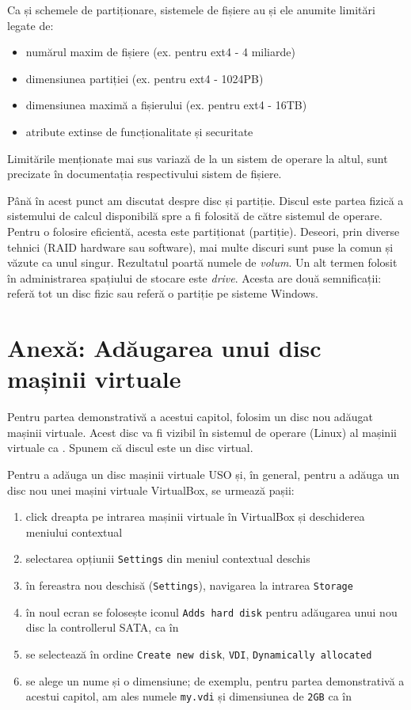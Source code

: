 Ca și schemele de partiționare, sistemele de fișiere au și ele anumite limitări legate de:

\begin{itemize}
  \item numărul maxim de fișiere (ex. pentru ext4 - 4 miliarde)
  \item dimensiunea partiției (ex. pentru ext4 - 1024PB)
  \item dimensiunea maximă a fișierului (ex. pentru ext4 - 16TB)
  \item atribute extinse de funcționalitate și securitate
\end{itemize}

Limitările menționate mai sus variază de la un sistem de operare la altul, sunt precizate în documentația respectivului sistem de fișiere.

Până în acest punct am discutat despre disc și partiție.
Discul este partea fizică a sistemului de calcul disponibilă spre a fi folosită de către sistemul de operare.
Pentru o folosire eficientă, acesta este partiționat (partiție).
 Deseori, prin diverse tehnici (RAID hardware sau software), mai multe discuri sunt puse la comun și văzute ca unul singur.
 Rezultatul poartă numele de \textit{volum}.
Un alt termen folosit în administrarea spațiului de stocare este \textit{drive}.
Acesta are două semnificații: referă tot un disc fizic sau referă o partiție pe sisteme Windows.

\section{Anexă: Adăugarea unui disc mașinii virtuale}
\label{sec:storage:vm-disk}

Pentru partea demonstrativă a acestui capitol, folosim un disc nou adăugat mașinii virtuale.
 Acest disc va fi vizibil în sistemul de operare (Linux) al mașinii virtuale ca .
Spunem că discul este un disc virtual.

Pentru a adăuga un disc mașinii virtuale USO și, în general, pentru a adăuga un disc nou unei mașini virtuale VirtualBox, se urmează pașii:
\begin{enumerate}
  \item click dreapta pe intrarea mașinii virtuale în VirtualBox și deschiderea meniului contextual
  \item selectarea opțiunii \texttt{Settings} din meniul contextual deschis
  \item în fereastra nou deschisă (\texttt{Settings}), navigarea la intrarea \texttt{Storage}
  \item în noul ecran se folosește iconul \texttt{Adds hard disk} pentru adăugarea unui nou disc la controllerul SATA, ca în 
  \item se selectează în ordine \texttt{Create new disk}, \texttt{VDI}, \texttt{Dynamically allocated}
  \item se alege un nume și o dimensiune;
    de exemplu, pentru partea demonstrativă a acestui capitol, am ales numele \texttt{my.vdi} și dimensiunea de \texttt{2GB} ca în 
\end{enumerate}

